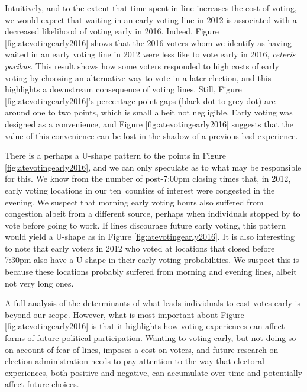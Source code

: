 \documentclass[12pt,titlepage]{article}
\newcommand{\numcounties}{ten}
\begin{document}
Intuitively, and to the extent that time spent in line increases the
cost of voting, we would expect that waiting in an early voting line
in 2012 is associated with a decreased likelihood of voting early in
2016.  Indeed, Figure \ref{fig:atevotingearly2016} shows that the 2016
voters whom we identify as having waited in an early voting line in
2012 were less like to vote early in 2016, \emph{ceteris paribus}.
This result shows how some voters responded to high costs of early
voting by choosing an alternative way to vote in a later election, and
this highlights a downstream consequence of voting lines.  Still,
Figure \ref{fig:atevotingearly2016}'s percentage point gaps (black dot
to grey dot) are around one to two points, which is small albeit not
negligible.  Early voting was designed as a convenience, and Figure
\ref{fig:atevotingearly2016} suggests that the value of this
convenience can be lost in the shadow of a previous bad experience.

There is a perhaps a U-shape pattern to the points in Figure
\ref{fig:atevotingearly2016}, and we can only speculate as to what may
be responsible for this. We know from the number of post-7:00pm
closing times that, in 2012, early voting locations in our
\numcounties\ counties of interest were congested in the evening. We
suspect that morning early voting hours also suffered from congestion
albeit from a different source, perhaps when individuals stopped by to
vote before going to work. If lines discourage future early voting,
this pattern would yield a U-shape as in Figure
\ref{fig:atevotingearly2016}. It is also interesting to note that
early voters in 2012 who voted at locations that closed before 7:30pm
also have a U-shape in their early voting probabilities. We suspect
this is because these locations probably suffered from morning and
evening lines, albeit not very long ones.


A full analysis of the determinants of what leads individuals to cast
votes early is beyond our scope.  However, what is most important
about Figure \ref{fig:atevotingearly2016} is that it highlights how
voting experiences can affect forms of future political participation.
Wanting to voting early, but not doing so on account of fear of lines,
imposes a cost on voters, and future research on election
administration needs to pay attention to the way that electoral
experiences, both positive and negative, can accumulate over time and
potentially affect future choices.
\end{document}

